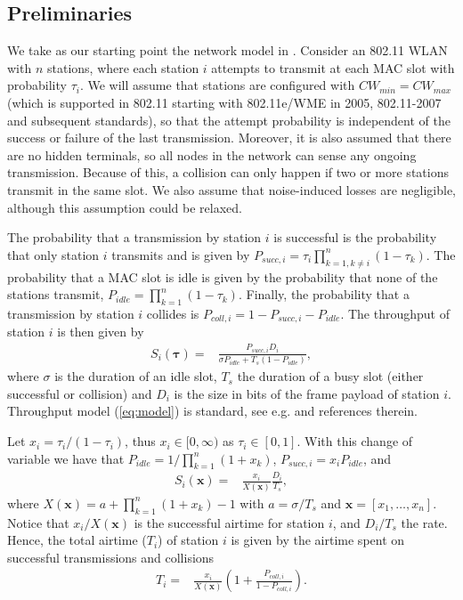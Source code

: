 \documentclass[11pt]{amsart}
\def\m#1{\mathbf{#1}}
\begin{document}
\subsection{Preliminaries}
We take as our starting point the network model in \cite{5910091}. Consider an 802.11 WLAN with $n$ stations, where each station $i$ attempts to transmit at each MAC slot with probability $\tau_i$. We will assume that stations are configured with $CW_{min} = CW_{max}$ (which is supported in 802.11 starting with 802.11e/WME in 2005, 802.11-2007 and subsequent standards), so that the attempt probability is independent of the success or failure of the last transmission. Moreover, it is also assumed that there are no hidden terminals, so all nodes in the network can sense any ongoing transmission.  Because of this, a collision can only happen if two or more stations transmit in the same slot. We also assume that noise-induced losses are negligible, although this assumption could be relaxed.

The probability that a transmission by station $i$ is successful is the probability that only station $i$ transmits and is given by $P_{succ,i} =  \tau_i  \prod_{k=1,k \ne i}^n (1-\tau_k)$. The probability that a MAC slot is idle is given by the probability that none of the stations transmit, $P_{idle} = \prod_{k=1}^n (1- \tau_k)$. Finally, the probability that a transmission by station $i$ collides is $P_{coll,i} = 1- P_{succ,i} - P_{idle}$. The throughput of station $i$ is then given by
\begin{align}\label{eq:model}
S_i(\boldsymbol \tau) = & \frac{P_{succ,i}D_i}{\sigma P_{idle} + T_s (1-P_{idle})},
\end{align}
where $\sigma$ is the duration of an idle slot, $T_s$ the duration of a busy slot (either successful or collision) and $D_i$ is the size in bits of the frame payload of station $i$.   Throughput model (\ref{eq:model}) is standard, see e.g.  \cite{5910091,6009216,4100720} and references therein.

Let $x_i= \tau_i / (1-\tau_i)$, thus $x_i \in [0,\infty)$ as $\tau_i \in [0,1]$. With this change of variable we have that $P_{idle} = 1 / \prod_{k=1}^n (1+x_k) $,  $P_{succ,i} = x_i P_{idle}$, and 
\begin{align}
S_i(\m{x}) = & \frac{x_i}{X(\m{x})}\frac{D_i}{T_s},  \label{eq:throughput}
\end{align} where $X(\m{x}) = a + \prod_{k=1}^n (1+x_k)-1$ with $a =  \sigma / T_s$ and $\m{x} = \left[ x_1, \dots, x_n \right]$. Notice that $x_i / X(\m{x})$ is the successful airtime for station $i$, and $D_i / T_s $ the rate. Hence, the total airtime  ($T_i$) of station $i$ is given by the airtime spent on successful transmissions and collisions
\begin{align}
T_i  =  & \frac{x_i}{X(\m{x})}\left( 1+ \frac{P_{coll,i}}{1-P_{coll,i}} \right) \label{eq:airtime}.
\end{align}
\end{document}
